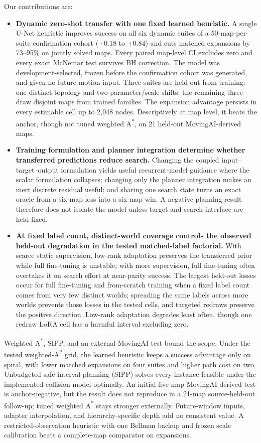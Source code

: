 \documentclass[letterpaper]{article} %
\begin{document}
Our contributions are:
\begin{itemize}
    \item \textbf{Dynamic zero-shot transfer with one fixed learned heuristic.} A single U-Net heuristic improves success on all six dynamic suites of a 50-map-per-suite confirmation cohort ($+0.18$ to $+0.84$) and cuts matched expansions by 73--95\% on jointly solved maps. Every paired map-level CI excludes zero and every exact McNemar test survives BH correction. The model was development-selected, frozen before the confirmation cohort was generated, and given no future-motion input. Three suites are held out from training: one distinct topology and two parameter/scale shifts; the remaining three draw disjoint maps from trained families. The expansion advantage persists in every estimable cell up to 2{,}048 nodes. Descriptively at map level, it beats the anchor, though not tuned weighted A\textsuperscript{*}, on 21 held-out MovingAI-derived maps.
    \item \textbf{Training formulation and planner integration determine whether transferred predictions reduce search.} Changing the coupled input--target--output formulation yields useful recurrent-model guidance where the scalar formulation collapses; changing only the planner integration makes an inert discrete residual useful; and sharing one search state turns an exact oracle from a six-map loss into a six-map win. A negative planning result therefore does not isolate the model unless target and search interface are held fixed.
    \item \textbf{At fixed label count, distinct-world coverage controls the observed held-out degradation in the tested matched-label factorial.} With scarce static supervision, low-rank adaptation preserves the transferred prior while full fine-tuning is unstable; with more supervision, full fine-tuning often overtakes it on search effort at near-parity success. The largest held-out losses occur for full fine-tuning and from-scratch training when a fixed label count comes from very few distinct worlds; spreading the same labels across more worlds prevents those losses in the tested cells, and targeted redraws preserve the positive direction. Low-rank adaptation degrades least often, though one redraw LoRA cell has a harmful interval excluding zero.
\end{itemize}
Weighted A\textsuperscript{*}, SIPP, and an external MovingAI test bound the scope. Under the tested weighted-A\textsuperscript{*} grid, the learned heuristic keeps a success advantage only on spiral, with lower matched expansions on four suites and higher path cost on two. Unbudgeted safe-interval planning (SIPP) solves every instance feasible under the implemented collision model optimally. An initial five-map MovingAI-derived test is anchor-negative, but the result does not reproduce in a 21-map source-held-out follow-up; tuned weighted A\textsuperscript{*} stays stronger externally. Future-window inputs, adapter interpolation, and hierarchy-specific depth add no consistent value. A restricted-observation heuristic with one Bellman backup and frozen scale calibration beats a complete-map comparator on expansions.
\end{document}
